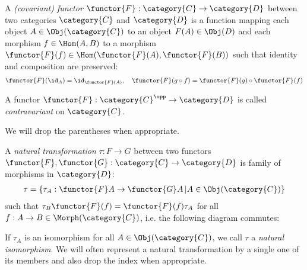 \documentclass[DIN, pagenumber=false, fontsize=11pt, parskip=half, colorinlistoftodos, svgnames]{scrartcl}
\begin{document}
	
	\begin{definition}[Functor]
		\label{def: functor}
		A \emph{(covariant) functor} $\functor{F}: \category{C} \rightarrow \category{D} $ between two categories $\category{C}$ and $\category{D} $ is a function mapping each object $A \in  \Obj(\category{C}) $ to an object $F(A) \in \Obj(D) $ and each morphism $ f \in \Hom(A,B) $ to a morphism $\functor{F}(f) \in \Hom(\functor{F}(A), \functor{F}(B))$ such that identity and composition are preserved:
		\begin{align*}
			\functor{F}(\id_A) = \id_{\functor{F}(A)},
			\quad
			\functor{F}(g\circ f) = \functor{F}(g) \circ \functor{F}(f)
		\end{align*}
		
		A functor $\functor{F}: \category{C}^\opp \rightarrow \category{D} $ is called \emph{contravariant} on $\category{C} $.
		
		We will drop the parentheses when appropriate.
	\end{definition}
	
	
	\begin{definition}
		\label{def: natTrans}
		A \emph{natural transformation} $\tau: F \rightarrow G $ between two functors $\functor{F}, \functor{G}: \category{C} \rightarrow \category{D} $ is family of morphisms in $\category{D}$:
		\begin{align*}
			\tau = \{ \tau_A : \functor{F}A \rightarrow \functor{G}A \,| A \in \Obj(\category{C})\}
		\end{align*}
		such that $\tau_B\functor{F}(f) = \functor{F}(f)\tau_A $ for all $f: A \rightarrow B \in \Morph(\category{C}) $, i.e. the following diagram commutes:
		
		\begin{center}
		\end{center}
		
		If $\tau_A$ is an isomorphism for all $A \in \Obj(\category{C}) $, we call $\tau$ a \emph{natural} \emph{isomorphism}.
		We will often represent a natural transformation by a single one of its members and also drop the index when appropriate.
	\end{definition}
	
\end{document}
